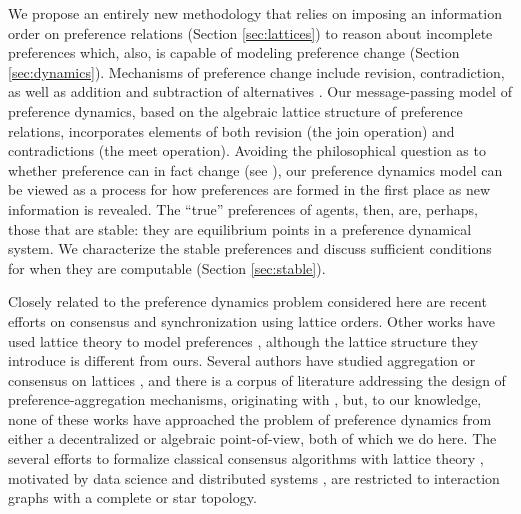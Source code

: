 \documentclass[conference]{ieeeconf}
\begin{document}
We propose an entirely new methodology that relies on imposing an information order on preference relations (Section \ref{sec:lattices}) to reason about incomplete preferences which, also, is capable of modeling preference change (Section \ref{sec:dynamics}). 
Mechanisms of preference change include revision, contradiction, as well as addition and subtraction of alternatives \cite{hansen1995}. Our message-passing model of preference dynamics, based on the algebraic lattice structure of preference relations, incorporates elements of both revision (the join operation) and contradictions (the meet operation).
Avoiding the philosophical question as to whether preference can in fact change (see \cite{stigler1977}), our preference dynamics model can be viewed as a process for how preferences are formed in the first place as new information is revealed. The ``true'' preferences of agents, then, are, perhaps, those that are stable: they are equilibrium points in a preference dynamical system. We characterize the stable preferences and discuss sufficient conditions for when they are computable (Section \ref{sec:stable}).


Closely related to the preference dynamics problem considered here are recent efforts on consensus \cite{riess2022} and synchronization \cite{riess2023} using lattice orders. Other works have used lattice theory to model preferences \cite{curello2019}, although the lattice structure they introduce is different from ours. Several authors have studied aggregation or consensus on lattices \cite{karacal2017,chambers2011}, and there is a corpus of literature addressing the design of preference-aggregation mechanisms, originating with \cite{arrow2012}, but, to our knowledge, none of these works have approached the problem of preference dynamics from either a decentralized or algebraic point-of-view, both of which we do here. The several efforts to formalize classical consensus algorithms with lattice theory \cite{barthelemy1991}, motivated by data science \cite{jeanpierre1986} and distributed systems \cite{attiya1995}, are restricted to interaction graphs with a complete or star topology.
\end{document}
